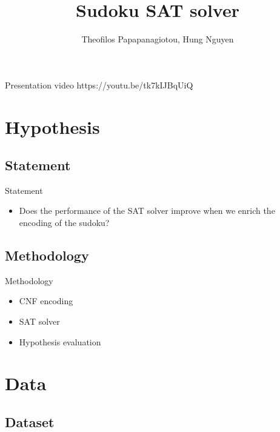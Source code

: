 \documentclass[11pt]{beamer}
\author{Theofilos Papapanagiotou, Hung Nguyen}
\title{Sudoku SAT solver}
\institute{UvA/VU}
\begin{document}
\begin{frame}
\titlepage
\end{frame}

\begin{frame}
\begin{multicols}{2}
\tableofcontents
\end{multicols}
\end{frame}

\begin{frame}{Presentation video}
https://youtu.be/tk7kIJBqUiQ
\end{frame}

\section{Hypothesis}

\subsection{Statement}

\begin{frame}{Statement}
\begin{itemize}
\item Does the performance of the SAT solver improve when we enrich the encoding of the sudoku?
\end{itemize}
\end{frame}

\subsection{Methodology}
\begin{frame}{Methodology}
\begin{itemize}
\item CNF encoding
\item SAT solver
\item Hypothesis evaluation
\end{itemize}
\end{frame}

\section{Data}

\subsection{Dataset}
\end{document}
